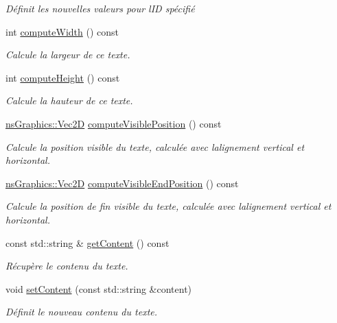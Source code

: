 \begin{DoxyCompactItemize}
\begin{DoxyCompactList}\small\item\em Définit les nouvelles valeurs pour l\textquotesingle{}ID spécifié \end{DoxyCompactList}\item 
int \hyperlink{classns_gui_1_1_text_a5ad119bf3e6c774c00711bb302f4bb1e}{compute\+Width} () const
\begin{DoxyCompactList}\small\item\em Calcule la largeur de ce texte. \end{DoxyCompactList}\item 
int \hyperlink{classns_gui_1_1_text_a40e2854b349731f1cdc0574e7297bc50}{compute\+Height} () const
\begin{DoxyCompactList}\small\item\em Calcule la hauteur de ce texte. \end{DoxyCompactList}\item 
\hyperlink{classns_graphics_1_1_vec2_d}{ns\+Graphics\+::\+Vec2D} \hyperlink{classns_gui_1_1_text_aa05c15547863bb237374487fe9ccfd2e}{compute\+Visible\+Position} () const
\begin{DoxyCompactList}\small\item\em Calcule la position visible du texte, calculée avec l\textquotesingle{}alignement vertical et horizontal. \end{DoxyCompactList}\item 
\hyperlink{classns_graphics_1_1_vec2_d}{ns\+Graphics\+::\+Vec2D} \hyperlink{classns_gui_1_1_text_af8a352a5cb3b4f849eda7badc11fbb31}{compute\+Visible\+End\+Position} () const
\begin{DoxyCompactList}\small\item\em Calcule la position de fin visible du texte, calculée avec l\textquotesingle{}alignement vertical et horizontal. \end{DoxyCompactList}\item 
const std\+::string \& \hyperlink{classns_gui_1_1_text_adea76711a628669e54020b282152e389}{get\+Content} () const
\begin{DoxyCompactList}\small\item\em Récupère le contenu du texte. \end{DoxyCompactList}\item 
void \hyperlink{classns_gui_1_1_text_a930caeda954e7517aa34bc5965c8709f}{set\+Content} (const std\+::string \&content)
\begin{DoxyCompactList}\small\item\em Définit le nouveau contenu du texte. \end{DoxyCompactList}\item 

\end{DoxyCompactItemize}
